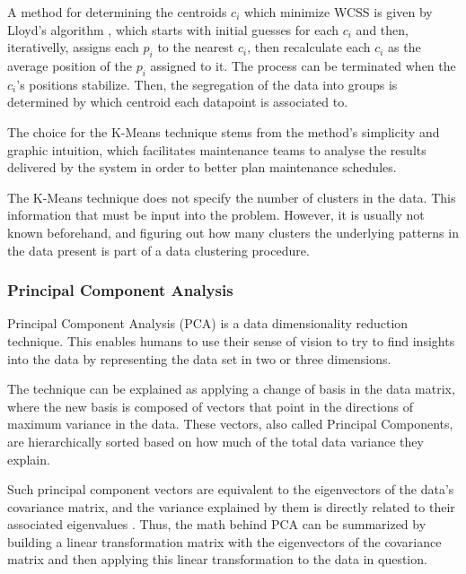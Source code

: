 \documentclass[conference]{IEEEtran}
\begin{document}
A method for determining the centroids $c_{i}$ which minimize WCSS is given by Lloyd's algorithm \cite{b3}, which starts with initial guesses for each $c_{i}$ and then, iterativelly, assigns each $p_{i}$ to the nearest $c_{i}$, then recalculate each $c_{i}$ as the average position of the $p_{i}$ assigned to it. The process can be terminated when the $c_{i}$'s positions stabilize. Then, the segregation of the data into groups is determined by which centroid each datapoint is associated to.

The choice for the K-Means technique stems from the method's simplicity and graphic intuition, which facilitates maintenance teams to analyse the results delivered by the system in order to better plan maintenance schedules. 


The K-Means technique does not specify the number of clusters in the data. This information that must be input into the problem. However, it is usually not known beforehand, and figuring out how many clusters the underlying patterns in the data present is part of a data clustering procedure. %

\subsubsection{Principal Component Analysis}

Principal Component Analysis (PCA) is a data dimensionality reduction technique. This enables humans to use their sense of vision to try to find insights into the data by representing the data set in two or three dimensions.

The technique can be explained as applying a change of basis in the data matrix, where the new basis is composed of vectors that point in the directions of maximum variance in the data. These vectors, also called Principal Components, are hierarchically sorted based on how much of the total data variance they explain.

Such principal component vectors are equivalent to the eigenvectors of the data's covariance matrix, and the variance explained by them is directly related to their associated eigenvalues \cite{b7}. Thus, the math behind PCA can be summarized by building a linear transformation matrix with the eigenvectors of the covariance matrix and then applying this linear transformation to the data in question.
\end{document}
